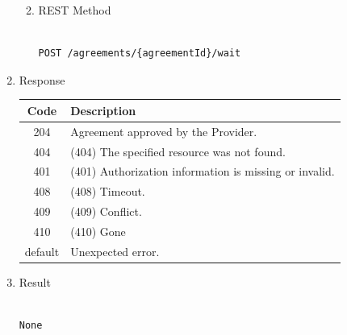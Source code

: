 \begin{enumerate}
\begin{enumerate}
\begin{center}
\begin{tabular}{|p{3cm}|l|p{3cm}|p{3cm}|p{4cm}|}
\end{tabular}
\end{center}

\item REST Method

\begin{tcolorbox}[boxrule=0pt, frame empty]
\begin{verbatim} 

POST /agreements/{agreementId}/wait

\end{verbatim}
\end{tcolorbox}

\end{enumerate}

\item Response

\begin{center}
\begin{tabular}{|c|l|} 
\hline
\rowcolor{lightgray}	Code 		& 	Description \\
\hline
204	 		&	Agreement approved by the Provider. \\
\hline
404			&	(404) The specified resource was not found. \\
\hline
401			&	(401) Authorization information is missing or invalid. \\
\hline
408			&	(408) Timeout. \\
\hline
409			&	(409) Conflict. \\
\hline
410			&	(410) Gone \\
\hline
default		&	Unexpected error. \\
\hline
\end{tabular}
\end{center}

\item Result

\begin{tcolorbox}[boxrule=0pt, frame empty]
\begin{verbatim}

None

\end{verbatim}
\end{tcolorbox}



\end{enumerate}
